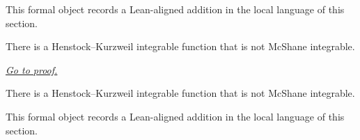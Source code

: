 \begin{remark*}[Interpretation]
This formal object records a Lean-aligned addition in the local language of this section.
\end{remark*}

\begin{dependencies}
\NoLocalDependencies
\end{dependencies}
\begin{theorem}
\label{thm:hk-strictly-wider-than-mcshane}
There is a Henstock--Kurzweil integrable function that is not McShane integrable.

\smallskip
\noindent
\hyperref[prf:hk-strictly-wider-than-mcshane]{\textit{Go to proof.}}
\end{theorem}

\begin{remark*}
There is a Henstock--Kurzweil integrable function that is not McShane integrable.
\end{remark*}

\begin{remark*}[Interpretation]
This formal object records a Lean-aligned addition in the local language of this section.
\end{remark*}

\begin{dependencies}
\NoLocalDependencies
\end{dependencies}
